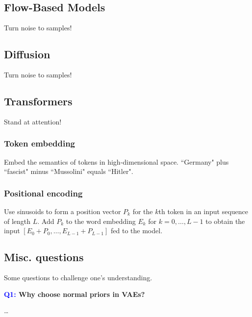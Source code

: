 \documentclass[11pt]{article}
\begin{document}
\subsection{Flow-Based Models}
Turn noise to samples!

\subsection{Diffusion}
Turn noise to samples!

\subsection{Transformers}
Stand at attention!

\subsubsection{Token embedding}
Embed the semantics of tokens in high-dimensional space. ``Germany" plus ``fascist" minus ``Mussolini" equals ``Hitler".

\subsubsection{Positional encoding}
Use sinusoids to form a position vector $P_k$ for the $k$th token in an input sequence of length $L$. Add $P_k$ to the word embedding $E_k$ for $k=0,\dots,L-1$ to obtain the input $[E_0+P_0,\dots,E_{L-1}+P_{L-1}]$ fed to the model.

\subsection{Misc. questions}

Some questions to challenge one's understanding.

\begin{center}
    \textbf{\textcolor{blue}{Q1:} Why choose normal priors in VAEs?}
\end{center}
\dots
\end{document}
